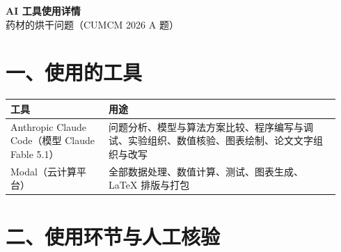 \documentclass[UTF8,zihao=-4,fontset=none,a4paper]{ctexart}
\begin{document}
\begin{center}{\LARGE\bfseries AI 工具使用详情}\\[6pt]{\large 药材的烘干问题（CUMCM 2026 A 题）}\end{center}

\section*{一、使用的工具}
\begin{longtable}{@{}p{0.28\linewidth}p{0.66\linewidth}@{}}
\toprule 工具 & 用途 \\ \midrule \endhead \bottomrule \endfoot
Anthropic Claude Code（模型 Claude Fable 5.1） & 问题分析、模型与算法方案比较、程序编写与调试、实验组织、数值核验、图表绘制、论文文字组织与改写 \\
Modal（云计算平台） & 全部数据处理、数值计算、测试、图表生成、LaTeX 排版与打包 \\
\end{longtable}

\section*{二、使用环节与人工核验}

\end{document}
